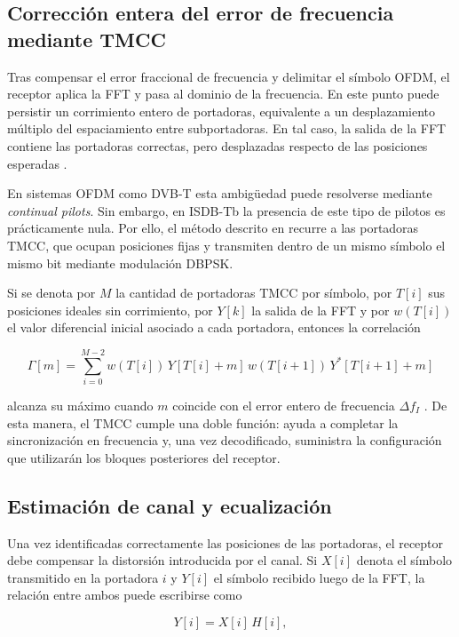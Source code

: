 \subsection{Corrección entera del error de frecuencia mediante TMCC}

Tras compensar el error fraccional de frecuencia y delimitar el símbolo OFDM, el receptor aplica la FFT y pasa al dominio de la frecuencia. En este punto puede persistir un corrimiento entero de portadoras, equivalente a un desplazamiento múltiplo del espaciamiento entre subportadoras. En tal caso, la salida de la FFT contiene las portadoras correctas, pero desplazadas respecto de las posiciones esperadas \cite{uruguay_rx}.

En sistemas OFDM como DVB-T esta ambigüedad puede resolverse mediante \textit{continual pilots}. Sin embargo, en ISDB-Tb la presencia de este tipo de pilotos es prácticamente nula. Por ello, el método descrito en \cite{uruguay_rx} recurre a las portadoras TMCC, que ocupan posiciones fijas y transmiten dentro de un mismo símbolo el mismo bit mediante modulación DBPSK.

Si se denota por $M$ la cantidad de portadoras TMCC por símbolo, por $T[i]$ sus posiciones ideales sin corrimiento, por $Y[k]$ la salida de la FFT y por $w(T[i])$ el valor diferencial inicial asociado a cada portadora, entonces la correlación

\begin{equation}
\Gamma[m]
=
\sum_{i=0}^{M-2}
w(T[i])\,Y[T[i]+m]\,
w(T[i+1])\,Y^{*}[T[i+1]+m]
\end{equation}

alcanza su máximo cuando $m$ coincide con el error entero de frecuencia $\Delta f_I$ \cite{uruguay_rx}. De esta manera, el TMCC cumple una doble función: ayuda a completar la sincronización en frecuencia y, una vez decodificado, suministra la configuración que utilizarán los bloques posteriores del receptor.

\subsection{Estimación de canal y ecualización}

Una vez identificadas correctamente las posiciones de las portadoras, el receptor debe compensar la distorsión introducida por el canal. Si $X[i]$ denota el símbolo transmitido en la portadora $i$ y $Y[i]$ el símbolo recibido luego de la FFT, la relación entre ambos puede escribirse como

\begin{equation}
Y[i] = X[i]\,H[i],
\end{equation}

